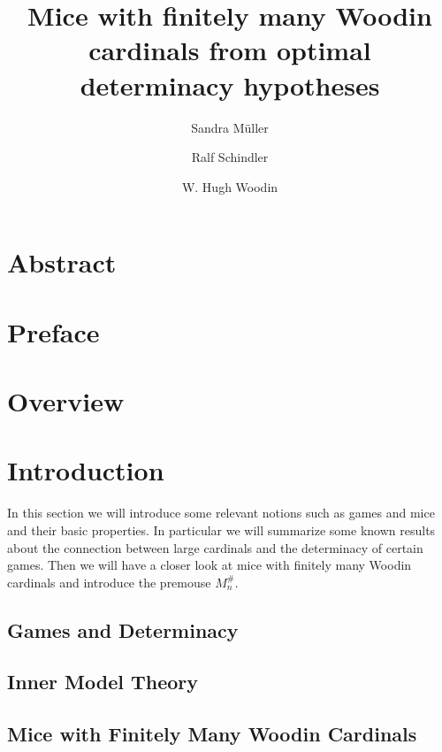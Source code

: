 \documentclass[11pt]{amsart}
\title[Mice from optimal determinacy hypotheses]{Mice with finitely many Woodin cardinals from optimal
  determinacy hypotheses}
\author{Sandra Müller}
\author{Ralf Schindler}
\author{W. Hugh Woodin}
\newcounter{cl}[satz]
\numberwithin{subsection}{section}
\theoremstyle{definition}
\theoremstyle{remark}
\begin{document}


\maketitle



\section*{Abstract}




\tableofcontents 

\section*{Preface} 





\section*{Overview}



\section{Introduction}
\label{ch:introproj}

In this section we will introduce some relevant notions such as games
and mice and their basic properties. In particular we will summarize
some known results about the connection between large cardinals and
the determinacy of certain games. Then we will have a closer look at
mice with finitely many Woodin cardinals and introduce the premouse
$M_n^\#$.

\subsection{Games and Determinacy}
\label{sec:GamesDet}



\subsection{Inner Model Theory}



\subsection{Mice with Finitely Many Woodin Cardinals}
\end{document}
